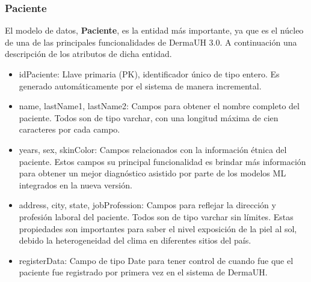 \subsubsection{Paciente}
El modelo de datos, \textbf{Paciente}, es la entidad m\'as importante, ya que es el n\'ucleo
de una de las principales funcionalidades de DermaUH 3.0. A continuaci\'on una descripci\'on 
de los atributos de dicha entidad.
\begin{itemize}
    \item idPaciente: Llave primaria (PK), identificador \'unico de tipo entero. Es generado autom\'aticamente por el sistema de manera incremental.
    \item name, lastName1, lastName2: Campos para obtener el nombre completo del paciente. Todos son de tipo varchar, con una longitud m\'axima de cien caracteres por cada campo.
    \item years, sex, skinColor: Campos relacionados con la informaci\'on \'etnica del paciente. Estos campos su principal funcionalidad es brindar m\'as informaci\'on para obtener un mejor diagn\'ostico asistido por parte de los modelos ML integrados en la nueva versi\'on.
    \item address, city, state, jobProfession: Campos para reflejar la direcci\'on y profesi\'on laboral del paciente. Todos son de tipo varchar sin l\'imites. Estas propiedades son importantes para saber el nivel exposici\'on de la piel al sol, debido la heterogeneidad del clima en diferentes sitios del pa\'is.
    \item registerData: Campo de tipo Date para tener control de cuando fue que el paciente fue registrado por primera vez en el sistema de DermaUH.
\end{itemize}

